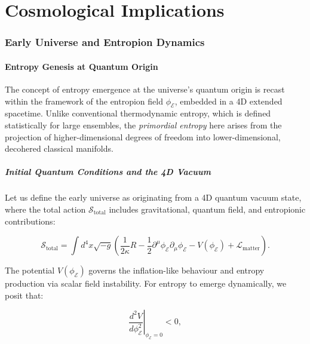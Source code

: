 \documentclass[12pt]{article}
\begin{document}
\part{Cosmological Implications}

\section{Early Universe and Entropion Dynamics}

\subsection{Entropy Genesis at Quantum Origin}
\label{subsec:entropy_genesis_quantum_origin}

The concept of entropy emergence at the universe’s quantum origin is recast within the framework of the entropion field \(\phi_{\mathcal{E}}\), embedded in a 4D extended spacetime. Unlike conventional thermodynamic entropy, which is defined statistically for large ensembles, the \emph{primordial entropy} here arises from the projection of higher-dimensional degrees of freedom into lower-dimensional, decohered classical manifolds.

\subsubsection*{Initial Quantum Conditions and the 4D Vacuum}

Let us define the early universe as originating from a 4D quantum vacuum state, where the total action \(\mathcal{S}_{\text{total}}\) includes gravitational, quantum field, and entropionic contributions:

\begin{equation}
\label{eq:total_action_early}
\mathcal{S}_{\text{total}} = \int d^4x \sqrt{-g} \left( \frac{1}{2\kappa} R - \frac{1}{2} \partial^\mu \phi_{\mathcal{E}} \partial_\mu \phi_{\mathcal{E}} - V(\phi_{\mathcal{E}}) + \mathcal{L}_{\text{matter}} \right).
\end{equation}

The potential \(V(\phi_{\mathcal{E}})\) governs the inflation-like behaviour and entropy production via scalar field instability. For entropy to emerge dynamically, we posit that:

\begin{equation}
\label{eq:entropy_condition}
\left. \frac{d^2 V}{d\phi_{\mathcal{E}}^2} \right|_{\phi_{\mathcal{E}} = 0} < 0,
\end{equation}
\end{document}
